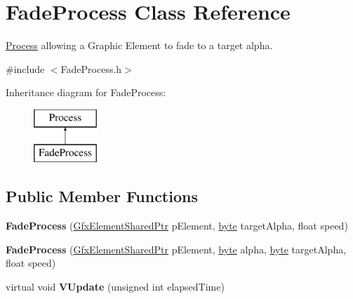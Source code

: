 \hypertarget{classFadeProcess}{\section{Fade\-Process Class Reference}
\label{classFadeProcess}
}


\hyperlink{classProcess}{Process} allowing a Graphic Element to fade to a target alpha.  




{\ttfamily \#include $<$Fade\-Process.\-h$>$}

Inheritance diagram for Fade\-Process\-:\begin{figure}[H]
\begin{center}
\leavevmode
\includegraphics[height=2.000000cm]{classFadeProcess}
\end{center}
\end{figure}
\subsection*{Public Member Functions}
\begin{DoxyCompactItemize}
\item 
\hypertarget{classFadeProcess_a588444afbad9cbf96f09548b8c44df10}{{\bfseries Fade\-Process} (\hyperlink{GfxElement_8h_a3e248bc53ba4f9161edd41d1b31b6724}{Gfx\-Element\-Shared\-Ptr} p\-Element, \hyperlink{GameStd_8h_a0c8186d9b9b7880309c27230bbb5e69d}{byte} target\-Alpha, float speed)}\label{classFadeProcess_a588444afbad9cbf96f09548b8c44df10}

\item 
\hypertarget{classFadeProcess_af56afb8d28af25fb56509e0b6936ad6e}{{\bfseries Fade\-Process} (\hyperlink{GfxElement_8h_a3e248bc53ba4f9161edd41d1b31b6724}{Gfx\-Element\-Shared\-Ptr} p\-Element, \hyperlink{GameStd_8h_a0c8186d9b9b7880309c27230bbb5e69d}{byte} alpha, \hyperlink{GameStd_8h_a0c8186d9b9b7880309c27230bbb5e69d}{byte} target\-Alpha, float speed)}\label{classFadeProcess_af56afb8d28af25fb56509e0b6936ad6e}

\item 
\hypertarget{classFadeProcess_a251c2dcb88b4f8344b69182fd219198f}{virtual void {\bfseries V\-Update} (unsigned int elapsed\-Time)}\label{classFadeProcess_a251c2dcb88b4f8344b69182fd219198f}

\end{DoxyCompactItemize}
